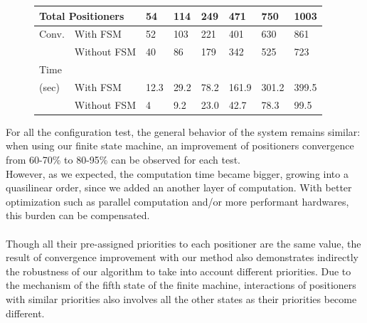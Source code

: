 \documentclass[]{spie}  %
\begin{document}
\begin{figure}[H]
\begin{minipage}{9cm}
{\begin{tabular}{|l|l|l|l|l|l|l|l|}
					\hline
					\multicolumn{2}{|l|}{Total Positioners}  & 54 & 114 & 249 & 471 & 750 & 1003\\
					\hline
					Conv. & With FSM  & 52 & 103 & 221 & 401 & 630 & 861 \\
					\cline{2-8}
					& Without FSM & 40  & 86 & 179 & 342 & 525 & 723 \\
					\hline
					Time\\(sec) & With FSM  & 12.3 & 29.2 & 78.2 & 161.9 & 301.2 & 399.5 \\
					\cline{2-8}
					& Without FSM  & 4  & 9.2 & 23.0 & 42.7 & 78.3  & 99.5 \\
					\hline
				\end{tabular}}
			\end{minipage}
		\end{figure}					
	For all the configuration test, the general behavior of the system remains similar: when using our finite state machine, an improvement of positioners convergence from 60-70\% to 80-95\% can be observed for each test.\\
	 However, as we expected, the computation time became bigger, growing into a quasilinear order, since we added an another layer of computation. With better optimization such as parallel computation and/or more performant hardwares, this burden can be compensated.\\\\
	 Though all their pre-assigned priorities to each positioner are the same value, the result of convergence improvement with our method also demonstrates indirectly the robustness of our algorithm to take into account different priorities. Due to the mechanism of the fifth state of the finite machine, interactions of positioners with similar priorities also involves all the other states as their priorities become different. \\\\
	
\end{document}
